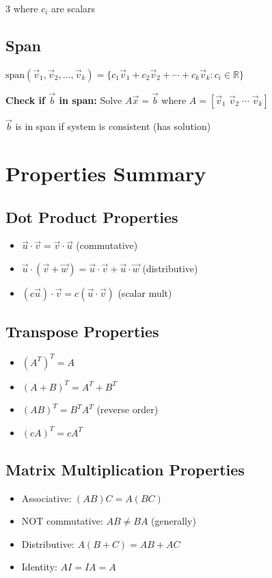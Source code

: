 \documentclass[10pt,landscape]{article}
\begin{document}
\begin{multicols*}{3}
where $c_i$ are scalars

\subsection*{Span}
$\text{span}(\vec{v}_1, \vec{v}_2, \ldots, \vec{v}_k) = \{c_1\vec{v}_1 + c_2\vec{v}_2 + \cdots + c_k\vec{v}_k : c_i \in \mathbb{R}\}$

\textbf{Check if $\vec{b}$ in span:} Solve $A\vec{x} = \vec{b}$ where $A = [\vec{v}_1 \; \vec{v}_2 \; \cdots \; \vec{v}_k]$

$\vec{b}$ is in span if system is consistent (has solution)

\section*{Properties Summary}

\subsection*{Dot Product Properties}
\begin{itemize}
    \item $\vec{u} \cdot \vec{v} = \vec{v} \cdot \vec{u}$ (commutative)
    \item $\vec{u} \cdot (\vec{v} + \vec{w}) = \vec{u} \cdot \vec{v} + \vec{u} \cdot \vec{w}$ (distributive)
    \item $(c\vec{u}) \cdot \vec{v} = c(\vec{u} \cdot \vec{v})$ (scalar mult)
\end{itemize}

\subsection*{Transpose Properties}
\begin{itemize}
    \item $(A^T)^T = A$
    \item $(A + B)^T = A^T + B^T$
    \item $(AB)^T = B^TA^T$ (reverse order)
    \item $(cA)^T = cA^T$
\end{itemize}

\subsection*{Matrix Multiplication Properties}
\begin{itemize}
    \item Associative: $(AB)C = A(BC)$
    \item NOT commutative: $AB \neq BA$ (generally)
    \item Distributive: $A(B+C) = AB + AC$
    \item Identity: $AI = IA = A$
\end{itemize}


\end{multicols*}
\end{document}
